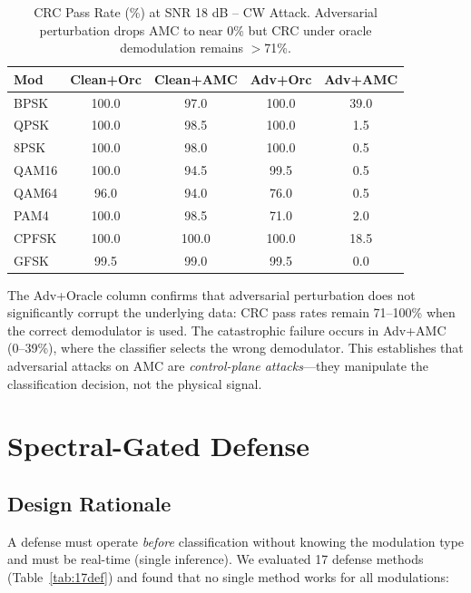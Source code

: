\documentclass[letterpaper,twocolumn,10pt]{article}
\begin{document}
\begin{table}[t]
\caption{CRC Pass Rate (\%) at SNR 18 dB -- CW Attack. Adversarial
  perturbation drops AMC to near 0\% but CRC under oracle demodulation
  remains $>$71\%.}
\label{tab:control}
\centering
\small
\begin{tabular}{lcccc}
\toprule
Mod & Clean+Orc & Clean+AMC & Adv+Orc & Adv+AMC \\
\midrule
BPSK  & 100.0 & 97.0 & 100.0 & 39.0 \\
QPSK  & 100.0 & 98.5 & 100.0 &  1.5 \\
8PSK  & 100.0 & 98.0 & 100.0 &  0.5 \\
QAM16 & 100.0 & 94.5 &  99.5 &  0.5 \\
QAM64 &  96.0 & 94.0 &  76.0 &  0.5 \\
PAM4  & 100.0 & 98.5 &  71.0 &  2.0 \\
CPFSK & 100.0 & 100.0 & 100.0 & 18.5 \\
GFSK  &  99.5 & 99.0 &  99.5 &  0.0 \\
\bottomrule
\end{tabular}
\end{table}

The Adv+Oracle column confirms that adversarial perturbation does not
significantly corrupt the underlying data: CRC pass rates remain
71--100\% when the correct demodulator is used. The catastrophic
failure occurs in Adv+AMC (0--39\%), where the classifier selects the
wrong demodulator. This establishes that adversarial attacks on AMC
are \emph{control-plane attacks}---they manipulate the classification
decision, not the physical signal.

\section{Spectral-Gated Defense}
\label{sec:defense}

\subsection{Design Rationale}

A defense must operate \emph{before} classification without knowing
the modulation type and must be real-time (single inference). We
evaluated 17 defense methods (Table~\ref{tab:17def}) and found
that no single method works for all modulations:
\end{document}
